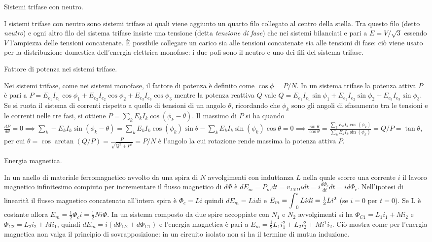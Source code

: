 \documentclass[answers, a4paper,12pt]{exam}
\newcommand{\bigint}{\mathop{\mathlarger{\int}}}
\begin{document}
\begin{questions}
\begin{solution}
		\end{solution}
	\question
	Sistemi trifase con neutro.
	\begin{solution}I sistemi trifase con neutro sono sistemi trifase ai quali viene aggiunto un quarto filo collegato al centro della stella. Tra questo filo (detto \textit{neutro}) e ogni altro filo del sistema trifase insiste una tensione (detta \textit{tensione di fase}) che nei sistemi bilanciati e pari a $E = V / \sqrt{3}$ essendo $V$ l'ampiezza delle tensioni concatenate. È possibile collegare un carico sia alle tensioni concatenate sia alle tensioni di fase: ciò viene usato per la distribuzione domestica dell'energia elettrica monofase: i due poli sono il neutro e uno dei fili del sistema trifase.\end{solution}
	\question
	Fattore di potenza nei sistemi trifase.
	\begin{solution}Nei sistemi trifase, come nei sistemi monofase, il fattore di potenza è definito come $\cos \phi = P / N$. In un sistema trifase la potenza attiva $P$ è pari a $P = E_{e_1} I_{e_1} \cos \phi_1 + E_{e_2} I_{e_2} \cos \phi_2 + E_{e_3} I_{e_3} \cos \phi_3$ mentre la potenza reattiva $Q$ vale $Q = E_{e_1} I_{e_1} \sin \phi_1 + E_{e_2} I_{e_2} \sin \phi_2 + E_{e_3} I_{e_3} \sin \phi_3$. Se si ruota il sistema di correnti rispetto a quello di tensioni di un angolo $\theta$, ricordando che $\phi_k$ sono gli angoli di sfasamento tra le tensioni e le correnti nelle tre fasi, si ottiene $P = \sum_k E_k I_k \cos (\phi_k - \theta)$. Il massimo di $P$ si ha quando $\frac{dP}{d\theta} = 0 \implies \sum_k - E_k I_k \sin (\phi_k - \theta) = \sum_k E_k I_k \cos (\phi_k)\sin\theta - \sum_k E_k I_k \sin (\phi_k) \cos \theta = 0 \implies \frac {\sin \theta}{\cos\theta} = \frac{\sum_k E_k I_k \cos (\phi_k)}{\sum_k E_k I_k \sin (\phi_k)} = Q/P = \tan \theta$, per cui $\theta = \cos \arctan (Q / P) = \frac{P}{\sqrt{Q^2 + P^2}} = P/N$ è l'angolo la cui rotazione rende massima la potenza attiva $P$.
	\end{solution}
		\pagebreak
	\question
	Energia magnetica.
	\begin{solution}In un anello di materiale ferromagnetico avvolto da una spira di $N$ avvolgimenti con induttanza $L$ nella quale scorre una corrente $i$ il lavoro magnetico infinitesimo compiuto per incrementare il flusso magnetico di $d\Phi$ è $dE_m = P_m dt = v_{IND} i dt = i \frac{d \Phi_c}{dt} dt = i d\Phi_c$. Nell'ipotesi di linearità il flusso magnetico concatenato all'intera spira è $\Phi_c = L i$ quindi $dE_m = L i di$ e $E_m = \bigint_0^i L i di = \frac{1}{2} L i^2$ (se $i = 0$ per $t = 0$). Se L è costante allora $E_m = \frac{1}{2} \Phi_c i = \frac{1}{2}N i \Phi$. In un sistema composto da due spire accoppiate con $N_1$ e $N_2$ avvolgimenti si ha $\Phi_{C1} = L_1 i_1 + M i_2$ e $\Phi_{C2} = L_2 i_2 + M i_1$, quindi $dE_m = i (d\Phi_{C2} + d\Phi_{C1})$ e l'energia magnetica è pari a $E_m = \frac{1}{2}{L_1 i_1^2 + L_2 i_2^2} + M i^1 i_2$. Ciò mostra come per l'energia magnetica non valga il principio di sovrapposizione: in un circuito isolato non si ha il termine di mutua induzione.  \end{solution}

\end{questions}
\end{document}
